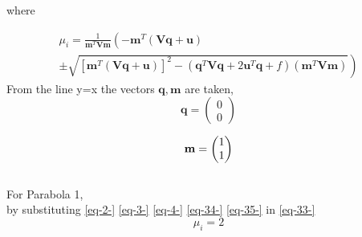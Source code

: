 \documentclass[journal,12pt,twocolumn]{IEEEtran}
\newcommand{\myvec}[1]{\ensuremath{\begin{pmatrix}#1\end{pmatrix}}}
\let\vec\mathbf
\let\vec\mathbf
\providecommand{\brak}[1]{\ensuremath{\left(#1\right)}}
\providecommand{\lbrak}[1]{\ensuremath{\left(#1\right.}}
\providecommand{\rbrak}[1]{\ensuremath{\left.#1\right)}}
\providecommand{\sbrak}[1]{\ensuremath{{}\left[#1\right]}}
\begin{document}
%
where
{\tiny
\begin{multline}
\mu_i = \frac{1}
{
\vec{m}^T\vec{V}\vec{m}
}
\lbrak{-\vec{m}^T\brak{\vec{V}\vec{q}+\vec{u}}}
\\
\pm
\rbrak{\sqrt{
\sbrak{
\vec{m}^T\brak{\vec{V}\vec{q}+\vec{u}}
}^2
-
\brak
{
\vec{q}^T\vec{V}\vec{q} + 2\vec{u}^T\vec{q} +f
}
\brak{\vec{m}^T\vec{V}\vec{m}}
\label{eq-33-} 
}
}
\end{multline}
\normalsize
From the line y=x the vectors $\vec{q},\vec{m}$ are taken,
\begin{equation}
\vec{q}=\myvec{0\\0}
\label{eq-34-} 
\end{equation}

\begin{equation} \\
\vec{m}=\myvec{1\\1}
\label{eq-35-} 
\end{equation}
\\
For Parabola 1,\\

by substituting \eqref{eq-2-} \eqref{eq-3-} \eqref{eq-4-} \eqref{eq-34-} \eqref{eq-35-}  in \hspace{1mm}\eqref{eq-33-}
\begin{equation}
\mu_i=2
\label{eq-36-} 
\end{equation}

}
\end{document}
